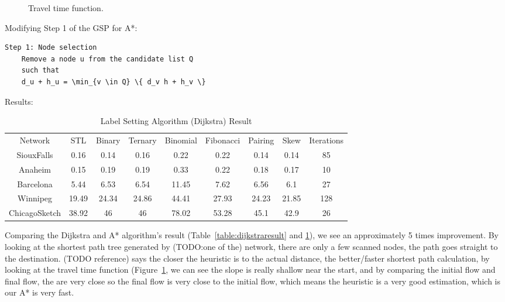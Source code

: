 \begin{figure}[H]
    \centering
    \caption{Travel time function.}
    \label{fig:flowfunction}
\end{figure}

Modifying Step 1 of the GSP for A*:
\begin{verbatim}
Step 1: Node selection
    Remove a node u from the candidate list Q
    such that
    d_u + h_u = \min_{v \in Q} \{ d_v h + h_v \}
\end{verbatim}

Results:

\begin{table}[H]
    \centering
    \begin{tabular}{ccccccccc}
        Network       & STL & Binary & Ternary & Binomial & Fibonacci & Pairing & Skew & Iterations \\
        SiouxFalls    & 0.16 & 0.14 & 0.16 & 0.22  & 0.22  & 0.14  & 0.14  & 85 \\
        Anaheim       & 0.15 & 0.19 & 0.19 & 0.33  & 0.22  & 0.18  & 0.17  & 10 \\
        Barcelona     & 5.44 & 6.53 & 6.54 & 11.45 & 7.62  & 6.56  & 6.1   & 27 \\
        Winnipeg      & 19.49& 24.34& 24.86& 44.41 & 27.93 & 24.23 & 21.85 & 128\\
        ChicagoSketch & 38.92& 46   & 46   & 78.02 & 53.28 & 45.1  & 42.9  & 26
    \end{tabular}
    \caption{Label Setting Algorithm (Dijkstra) Result}
    \label{table:astarresult}
\end{table}

Comparing the Dijkstra and A* algorithm's result (Table~\ref{table:dijkstraresult} and \ref{table:astarresult}),
we see an approximately 5 times improvement.
By looking at the shortest path tree generated
by (TODO:one of the) network,
there are only a few scanned nodes,
the path goes straight to the destination.
(TODO reference) says the closer the heuristic is to the actual
distance,
the better/faster shortest path calculation,
by looking at the travel time function (Figure~\ref{fig:flowfunction}, we can see the slope
is really shallow near the start,
and by comparing the initial flow and final flow,
the are very close so the final flow is very close to the
initial flow,
which means the heuristic is a very good estimation,
which is our A* is very fast.

